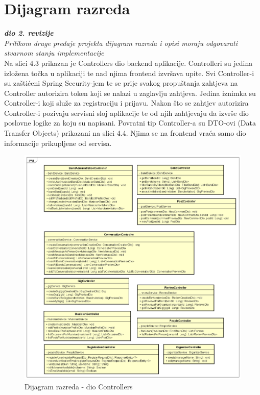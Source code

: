 			
			
		\section{Dijagram razreda}


			\textit{\textbf{dio 2. revizije}} \\
			
			\textit{Prilikom druge predaje projekta dijagram razreda i opisi moraju odgovarati stvarnom stanju implementacije} \\
			
			
			Na slici 4.3 prikazan je Controllers dio backend aplikacije. Controlleri su jedina izložena točka u aplikaciji te nad njima frontend izvršava upite. Svi Controller-i su zaštićeni Spring Security-jem te se prije svakog propuštanja zahtjeva na Controller autorizira token koji se nalazi u zaglavlju zahtjeva. Jedina iznimka su Controller-i koji služe za registraciju i prijavu. Nakon što se zahtjev autorizira Controller-i pozivaju servisni sloj aplikacije te od njih zahtjevaju da izvrše dio poslovne logike za koju su napisani. Povratni tip Controller-a su DTO-ovi (Data Transfer Objects) prikazani na slici 4.4. Njima se na frontend vraća samo dio informacije prikupljene od servisa.  

			\begin{figure}[H]
				\begin{center}
					\includegraphics[width=17cm]{slike/kontroleri.PNG}
				\end{center}
				\caption{Dijagram razreda - dio Controllers}
				\label{fig:kontroleri}
			\end{figure}
		
